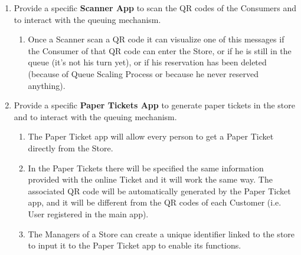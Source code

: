 \documentclass[a4paper, 10pt, oneside]{article}
\begin{document}
\begin{enumerate}[align=left]
    \item \label{req:scannerApp}Provide a specific \textbf{Scanner App} to scan the QR codes of the Consumers and to interact with the queuing mechanism.
    \begin{enumerate}[label={-}]
        \item \label{req:scannerApp:response} Once a Scanner scan a QR code it can visualize one of this messages if the Consumer of that QR code can enter the Store, or if he is still in the queue (it's not his turn yet), or if his reservation has been deleted (because of Queue Scaling Process or because he never reserved anything).
    \end{enumerate}
    
    \item \label{req:paperTicketApp}Provide a specific \textbf{Paper Tickets App} to generate paper tickets in the store and to interact with the queuing mechanism.
    \begin{enumerate}[label={-}]
        \item \label{req:paperTicketApp:func}The Paper Ticket app will allow every person to get a Paper Ticket directly from the Store.
        \item \label{req:paperTicketApp:funcPaperTick}In the Paper Tickets there will be specified the same information provided with the online Ticket and it will work the same way. The associated QR code will be automatically generated by the Paper Ticket app, and it will be different from the QR codes of each Customer (i.e. User registered in the main app).
        \item \label{req:paperTicketApp:createCode}The Managers of a Store can create a unique identifier linked to the store to input it to the Paper Ticket app to enable its functions.
    \end{enumerate}
    

\end{enumerate}
\end{document}
